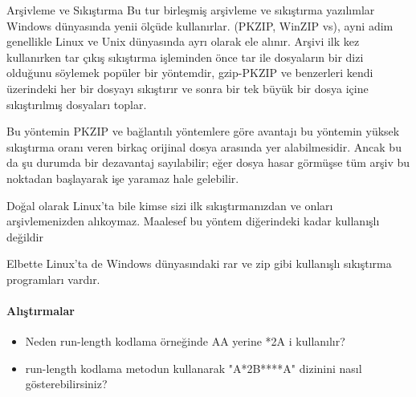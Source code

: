 \documentclass[10pt,a5paper]{book}
\begin{document}
\begin{section}{Arşivleme ve Sıkıştırma}
Bu tur birleşmiş arşivleme ve sıkıştırma yazılımlar Windows dünyasında yenii ölçüde kullanırlar. (PKZIP, WinZIP vs), ayni adim genellikle Linux ve Unix dünyasında ayrı olarak ele alınır. Arşivi ilk kez kullanırken tar çıkış sıkıştırma işleminden önce tar ile dosyaların bir dizi olduğunu söylemek popüler bir yöntemdir, gzip-PKZIP ve benzerleri kendi üzerindeki her bir dosyayı sıkıştırır ve sonra bir tek büyük bir dosya içine sıkıştırılmış dosyaları toplar.

Bu yöntemin PKZIP ve bağlantılı yöntemlere göre avantajı bu yöntemin yüksek sıkıştırma oranı veren birkaç orijinal dosya arasında yer alabilmesidir. Ancak bu da şu durumda bir dezavantaj sayılabilir; eğer dosya hasar görmüşse tüm arşiv bu noktadan başlayarak işe yaramaz hale gelebilir.

Doğal olarak Linux’ta bile kimse sizi ilk sıkıştırmanızdan ve onları arşivlemenizden alıkoymaz. Maalesef bu yöntem diğerindeki kadar kullanışlı değildir

Elbette Linux’ta de Windows dünyasındaki rar ve zip gibi kullanışlı sıkıştırma programları vardır.
\paragraph{Alıştırmalar}{
\begin{itemize}
 \item Neden run-length kodlama örneğinde AA yerine *2A i kullanılır?
 \item run-length kodlama metodun kullanarak "A*2B****A" dizinini
nasıl gösterebilirsiniz?
\end{itemize}}
\end{section}
\end{document}
